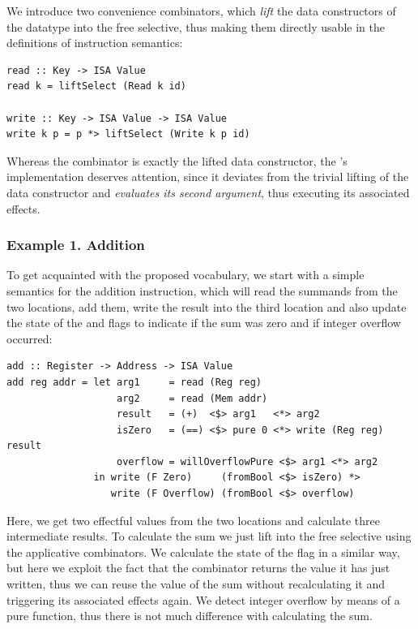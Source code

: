 We introduce two convenience combinators, which \emph{lift} the data constructors
of the  datatype into the free selective, thus making them directly usable in
the definitions of instruction semantics:

\begin{verbatim}
read :: Key -> ISA Value
read k = liftSelect (Read k id)

write :: Key -> ISA Value -> ISA Value
write k p = p *> liftSelect (Write k p id)
\end{verbatim}

Whereas the  combinator is exactly the lifted  data constructor, the 's implementation deserves attention, since it deviates from the trivial lifting of
the  data constructor and \emph{evaluates its second argument}, thus executing its
associated effects.

\subsubsection{\textbf{Example 1. Addition}}

To get acquainted with the proposed vocabulary, we start with a simple semantics for
the addition instruction, which will read the summands from the two locations, add them,
write the result into the third location and also update the state of the 
and  flags to indicate if the sum was zero and if integer overflow occurred:

\begin{verbatim}
add :: Register -> Address -> ISA Value
add reg addr = let arg1     = read (Reg reg)
                   arg2     = read (Mem addr)
                   result   = (+)  <$> arg1   <*> arg2
                   isZero   = (==) <$> pure 0 <*> write (Reg reg) result
                   overflow = willOverflowPure <$> arg1 <*> arg2
               in write (F Zero)     (fromBool <$> isZero) *>
                  write (F Overflow) (fromBool <$> overflow)
\end{verbatim}

Here, we get two effectful values from the two locations and calculate three intermediate
results. To calculate the sum we just lift \hs{+} into the free selective using the applicative
combinators. We calculate the state of the  flag in a similar way, but here we
exploit the fact that the  combinator returns the value it has just written, thus we
can reuse the value of the sum without recalculating it and triggering its associated effects
again. We detect integer overflow by means of a pure function, thus there is not much difference
with calculating the sum.

